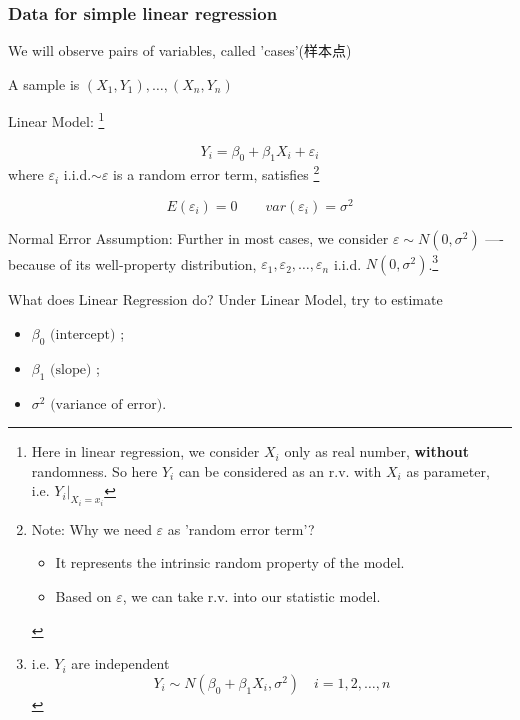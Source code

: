     


        
\subsubsection{Data for simple linear regression}

    We will observe pairs of variables, called 'cases'(样本点)
        
    A sample is $ (X_1,Y_1),\ldots,(X_n,Y_n) $

    Linear Model: \footnote{Here in linear regression, we consider $ X_i $ only as real number, \textbf{without} randomness. So here $ Y_i $ can be considered as an r.v. with $ X_i $ as parameter, i.e. $ Y_i|_{X_i=x_i} $}

    \[
        Y_i=\beta _0+\beta _1X_i+\varepsilon _i 
    \]
    where $ \varepsilon_i  $ i.i.d.$ \sim \varepsilon  $ is a random error term, satisfies    \footnote{Note: Why we need $ \varepsilon $ as 'random error term'?
    \begin{itemize}[topsep=6pt,itemsep=4pt]
        \item It represents the intrinsic random property of the model.
        \item Based on $ \varepsilon  $, we can take r.v. into our statistic model.
    \end{itemize}
    }
    
    \[
        E(\varepsilon _i)=0\qquad var(\varepsilon _i)=\sigma ^2 
    \]
    
    

    Normal Error Assumption: Further in most cases, we consider $ \varepsilon \sim N(0,\sigma^2) $ ----because of its well-property distribution, $ \varepsilon _1,\varepsilon _2,\ldots,\varepsilon _n $ i.i.d. $ N(0,\sigma ^2) $.\footnote{i.e. $ Y_i $ are independent
    \[
        Y_i\sim N(\beta _0+\beta _1X_i,\sigma^2)\quad i=1,2,\ldots ,n 
    \]
    
    }
        
    What does Linear Regression do? Under Linear Model, try to estimate 
    \begin{itemize}[topsep=0pt,itemsep=-2pt]
        \item $ \beta _0\text{ (intercept) }$;
        \item $\beta _1\text{ (slope) }$;
        \item $\sigma ^2\text{ (variance of error)} $.
    \end{itemize}
    
